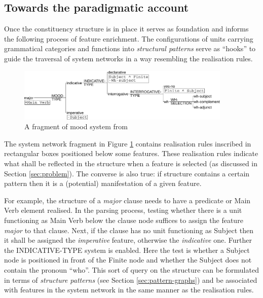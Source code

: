 
\subsection{Towards the paradigmatic account}
\label{sec:paradigmatic-account}
Once the constituency structure is in place it serves as foundation and informs the following process of feature enrichment. The configurations of units carrying grammatical categories and functions into \textit{structural patterns} serve as ``hooks'' to guide the traversal of system networks in a way resembling the realisation rules. %

\begin{figure}[!ht]
    \centering      
    \includegraphics[width=0.91\textwidth]{Figures/Example/just-mood.pdf}      
    \caption{A fragment of mood system from \citet[366]{Halliday2013}}
    \label{fig:just-mood}
\end{figure}

The system network fragment in Figure \ref{fig:just-mood} contains realisation rules inscribed in rectangular boxes positioned below some features. These realisation rules indicate what shall be reflected in the structure when a feature is selected (as discussed in Section \ref{sec:problem}). The converse is also true: if structure contains a certain pattern then it is a (potential) manifestation of a given feature. 

For example, the structure of a \textit{major} clause needs to have a predicate or Main Verb element realised. In the parsing process, testing whether there is a unit functioning as Main Verb below the clause node suffices to assign the feature \textit{major} to that clause. Next, if the clause has no unit functioning as Subject then it shall be assigned the \textit{imperative} feature, otherwise the \textit{indicative} one. Further the INDICATIVE-TYPE system is enabled. Here the test is whether a Subject node is positioned in front of the Finite node and whether the Subject does not contain the pronoun ``who''. This sort of query on the structure can be formulated in terms of \textit{structure patterns} (see Section \ref{sec:pattern-graphs}) and be associated with features in the system network in the same manner as the realisation rules. 

